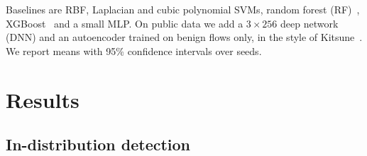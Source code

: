 \documentclass[conference,10pt]{IEEEtran}
\begin{document}
Baselines are RBF, Laplacian and cubic polynomial SVMs, random forest
(RF)~\cite{breiman2001random}, XGBoost~\cite{chen2016xgboost} and a small MLP. On
public data we add a $3\times256$ deep network (DNN) and an autoencoder trained on
benign flows only, in the style of Kitsune~\cite{mirsky2018kitsune}. We report
means with 95\% confidence intervals over seeds.

\section{Results}
\label{sec:results}

\subsection{In-distribution detection}
\end{document}
